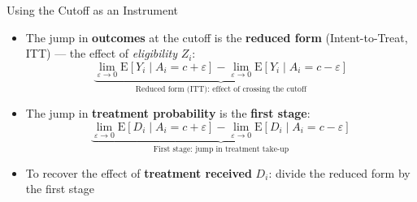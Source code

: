 \documentclass[hyperref={pdfpagelabels=false}]{beamer}
\begin{document}
\begin{frame}{Using the Cutoff as an Instrument}{}

\begin{itemize}
    \item The jump in \textbf{outcomes} at the cutoff is the
          \textbf{reduced form} (Intent-to-Treat, ITT) ---
          the effect of \emph{eligibility} $Z_i$:
    \begin{equation*}
        \underbrace{
        \lim_{\varepsilon\rightarrow 0}
        \mathrm{E}[Y_{i}\mid A_{i}=c+\varepsilon]
        -
        \lim_{\varepsilon\rightarrow 0}
        \mathrm{E}[Y_{i}\mid A_{i}=c-\varepsilon]
        }_{\text{Reduced form (ITT): effect of crossing the cutoff}}
    \end{equation*}

    \vspace{0.15cm}
    \item The jump in \textbf{treatment probability} is the
          \textbf{first stage}:
    \begin{equation*}
        \underbrace{
        \lim_{\varepsilon\rightarrow 0}
        \mathrm{E}[D_{i}\mid A_{i}=c+\varepsilon]
        -
        \lim_{\varepsilon\rightarrow 0}
        \mathrm{E}[D_{i}\mid A_{i}=c-\varepsilon]
        }_{\text{First stage: jump in treatment take-up}}
    \end{equation*}

    \vspace{0.15cm}
    \item To recover the effect of \textbf{treatment received} $D_i$:
          divide the reduced form by the first stage
\end{itemize}
\end{frame}
\end{document}
